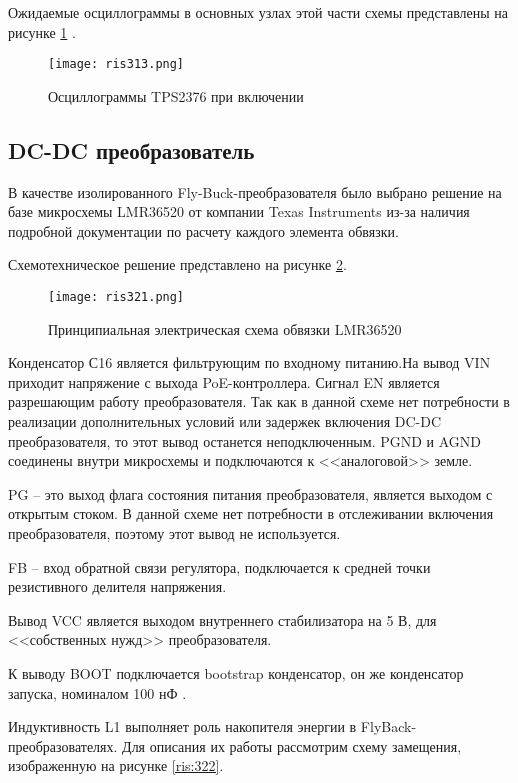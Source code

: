 Ожидаемые осциллограммы в основных узлах этой части схемы представлены на рисунке 
\ref{ris:313} \cite{TPS2376:datasheet}.

\begin{figure}[H]
    \centering
    \texttt{[image: ris313.png]}
    \caption{Осциллограммы TPS2376 при включении}
    \label{ris:313}
\end{figure}

\subsection{DC-DC преобразователь}
\hspace{1cm} 

В качестве изолированного Fly-Buck-преобразователя было выбрано решение на базе микросхемы LMR36520 
от компании Texas Instruments из-за наличия подробной документации по расчету каждого элемента
обвязки. 

Схемотехническое решение представлено на рисунке \ref{ris:321}.

\begin{figure}[H]
    \centering
    \texttt{[image: ris321.png]}
    \caption{Принципиальная электрическая схема обвязки LMR36520}
    \label{ris:321}
\end{figure}

Конденсатор С16 является фильтрующим по входному питанию.На вывод VIN приходит напряжение
с выхода PoE-контроллера. Сигнал EN является разрешающим работу преобразователя. Так как
в данной схеме нет потребности в реализации дополнительных условий или задержек включения
DC-DC преобразователя, то этот вывод останется неподключенным. PGND и AGND соединены внутри 
микросхемы и подключаются к <<аналоговой>> земле. 

PG -- это выход флага состояния питания преобразователя, является выходом с открытым стоком. 
В данной схеме нет потребности в отслеживании включения преобразователя, поэтому этот вывод не 
используется. 

FB -- вход обратной связи регулятора, подключается к средней точки резистивного делителя
напряжения.

Вывод VCC является выходом внутреннего стабилизатора на 5 В, для <<собственных нужд>> преобразователя.

К выводу BOOT подключается bootstrap конденсатор, он же конденсатор запуска, номиналом 100 нФ 
\cite{LMR36520:datasheet}. 

Индуктивность L1 выполняет роль накопителя энергии в FlyBack-преобразователях.
Для описания их работы рассмотрим схему замещения, изображенную на рисунке \ref{ris:322}.

